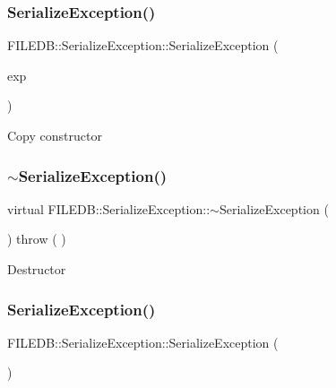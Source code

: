 \subsubsection{\texorpdfstring{SerializeException()}{SerializeException()}\hspace{0.1cm}{\footnotesize\ttfamily [8/9]}}
{\footnotesize\ttfamily F\+I\+L\+E\+D\+B\+::\+Serialize\+Exception\+::\+Serialize\+Exception (\begin{DoxyParamCaption}\item[{const \mbox{\hyperlink{classFILEDB_1_1SerializeException}{Serialize\+Exception}} \&}]{exp }\end{DoxyParamCaption})}

Copy constructor \mbox{\label{classFILEDB_1_1SerializeException_ace236a2abdc486c44c695fbdc209923a}} 
\subsubsection{\texorpdfstring{$\sim$SerializeException()}{~SerializeException()}\hspace{0.1cm}{\footnotesize\ttfamily [3/3]}}
{\footnotesize\ttfamily virtual F\+I\+L\+E\+D\+B\+::\+Serialize\+Exception\+::$\sim$\+Serialize\+Exception (\begin{DoxyParamCaption}\item[{void}]{ }\end{DoxyParamCaption}) throw ( ) \hspace{0.3cm}{\ttfamily [virtual]}}

Destructor \mbox{\label{classFILEDB_1_1SerializeException_a84b139cba956139f16f27094d53fd68a}} 
\subsubsection{\texorpdfstring{SerializeException()}{SerializeException()}\hspace{0.1cm}{\footnotesize\ttfamily [9/9]}}
{\footnotesize\ttfamily F\+I\+L\+E\+D\+B\+::\+Serialize\+Exception\+::\+Serialize\+Exception (\begin{DoxyParamCaption}\item[{void}]{ }\end{DoxyParamCaption})\hspace{0.3cm}{\ttfamily [protected]}}



